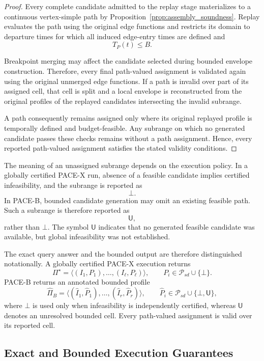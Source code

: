 \documentclass[a4paper,fleqn]{cas-dc}
\begin{document}
\begin{proof}
Every complete candidate admitted to the replay stage materializes to a
continuous vertex-simple path by
Proposition~\ref{prop:assembly_soundness}. Replay evaluates the path using the
original edge functions and restricts its domain to departure times for which
all induced edge-entry times are defined and
\[
T_P(t)\leq B.
\]

Breakpoint merging may affect the candidate selected during bounded envelope
construction. Therefore, every final path-valued assignment is validated again
using the original unmerged edge functions. If a path is invalid over part of
its assigned cell, that cell is split and a local envelope is reconstructed
from the original profiles of the replayed candidates intersecting the invalid
subrange.

A path consequently remains assigned only where its original replayed profile
is temporally defined and budget-feasible. Any subrange on which no generated
candidate passes these checks remains without a path assignment. Hence, every
reported path-valued assignment satisfies the stated validity conditions.
\end{proof}

The meaning of an unassigned subrange depends on the execution policy. In a
globally certified PACE-X run, absence of a feasible candidate implies
certified infeasibility, and the subrange is reported as
\[
\bot.
\]
In PACE-B, bounded candidate generation may omit an existing feasible path.
Such a subrange is therefore reported as
\[
\mathsf{U},
\]
rather than \(\bot\). The symbol \(\mathsf{U}\) indicates that no generated
feasible candidate was available, but global infeasibility was not
established.

The exact query answer and the bounded output are therefore distinguished
notationally. A globally certified PACE-X execution returns
\[
\Pi^{\star}
=
\langle
(I_1,P_1),\ldots,(I_\ell,P_\ell)
\rangle,
\qquad
P_i\in\mathcal{P}_{sd}\cup\{\bot\}.
\]
PACE-B returns an annotated bounded profile
\[
\widehat{\Pi}_{B}
=
\langle
(\widehat I_1,\widehat P_1),\ldots,
(\widehat I_r,\widehat P_r)
\rangle,
\qquad
\widehat P_i\in
\mathcal{P}_{sd}\cup\{\bot,\mathsf{U}\},
\]
where \(\bot\) is used only when infeasibility is independently certified,
whereas \(\mathsf{U}\) denotes an unresolved bounded cell. Every path-valued
assignment is valid over its reported cell.

\subsection{Exact and Bounded Execution Guarantees}
\label{subsec:analysis_modes}
\end{document}
